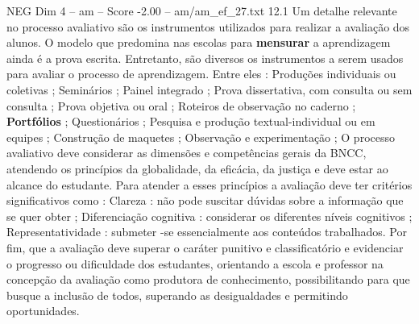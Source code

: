 \begin{textsample}{NEG Dim 4 – am – Score -2.00 – am/am\_ef\_27.txt}  \label{ex:f4_neg_181}
12.1 Um detalhe relevante no processo avaliativo são os instrumentos utilizados para realizar a avaliação dos alunos.
O modelo que predomina nas escolas para \textbf{mensurar} a aprendizagem ainda é a prova escrita.
Entretanto, são diversos os instrumentos a serem usados para avaliar o processo de aprendizagem.
Entre eles : Produções individuais ou coletivas ; Seminários ; Painel integrado ; Prova dissertativa, com consulta ou sem consulta ; Prova objetiva ou oral ; Roteiros de observação no caderno ; \textbf{Portfólios} ; Questionários ; Pesquisa e produção textual-individual ou em equipes ; Construção de maquetes ; Observação e experimentação ; O processo avaliativo deve considerar as dimensões e competências gerais da BNCC, atendendo os princípios da globalidade, da eficácia, da justiça e deve estar ao alcance do estudante.
Para atender a esses princípios a avaliação deve ter critérios significativos como : Clareza : não pode suscitar dúvidas sobre a informação que se quer obter ; Diferenciação cognitiva : considerar os diferentes níveis cognitivos ; Representatividade : submeter -se essencialmente aos conteúdos trabalhados.
Por fim, que a avaliação deve superar o caráter punitivo e classificatório e evidenciar o progresso ou dificuldade dos estudantes, orientando a escola e professor na concepção da avaliação como produtora de conhecimento, possibilitando para que busque a inclusão de todos, superando as desigualdades e permitindo oportunidades.

\end{textsample}
